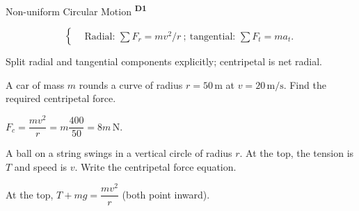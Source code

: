 ﻿\documentclass[12pt,a4paper]{article}
\providecommand{\KPFormulas}{}
\providecommand{\KPHeuristics}{}
\providecommand{\KPProblems}{}
\newcommand{\DOne}{\texorpdfstring{\textsuperscript{\textbf{D1}}}{ D1}}
\begin{document}
\begin{KnowledgePoint}{Non-uniform Circular Motion \DOne}
  \KPFormulas
  \begin{formulabox}
  \[
  \left\{\begin{aligned}
    &\text{Radial: } \sum F_r=m v^2/r\ ;\ \text{tangential: } \sum F_t=m a_t.
  \end{aligned}\right.
  \]
  \end{formulabox}

  \KPHeuristics
  \begin{heuristicsbox}
  Split radial and tangential components explicitly; centripetal is net radial.
  \end{heuristicsbox}

  \KPProblems
\begin{cheatproblem}
  A car of mass $m$ rounds a curve of radius $r=50\,\text{m}$ at $v=20\,\text{m/s}$. Find the required centripetal force.
\begin{solutionbox}
  $F_c=\dfrac{mv^2}{r}=m\dfrac{400}{50}=8m\,\text{N}$.
\end{solutionbox}
\end{cheatproblem}
\begin{cheatproblem}
  A ball on a string swings in a vertical circle of radius $r$. At the top, the tension is $T$ and speed is $v$. Write the centripetal force equation.
\begin{solutionbox}
  At the top, $T+mg=\dfrac{mv^2}{r}$ (both point inward).
\end{solutionbox}
\end{cheatproblem}
\end{KnowledgePoint}
\end{document}
